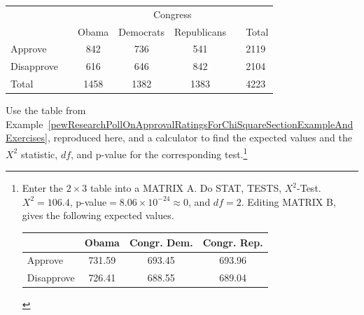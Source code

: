 \begin{tabular}{ll ccc ll}
& & & \multicolumn{2}{c}{Congress} & \\
\cline{4-5}
 & \hspace{1mm} & Obama & Democrats & Republicans & \hspace{1mm} & Total \\
\hline
Approve				   & & 842    & 736 & 541   & 				& 2119 \\
Disapprove			   & & 616    & 646 & 842   &				& 2104 \\
\hline
Total					   & & 1458    & 1382 & 1383 & 				& 4223 \\
\hline
\end{tabular}
 

\begin{exercise}
Use the table from Example~\ref{pewResearchPollOnApprovalRatingsForChiSquareSectionExampleAndExercises}, reproduced here, and a calculator to find the expected values and the $X^2$ statistic, $df$, and p-value for the corresponding test.\footnote{Enter the $2\times 3$ table into a MATRIX A. Do STAT, TESTS, $X^2$-Test. $X^2=106.4$, p-value$=8.06\times 10^{-24}\approx 0$, and $df=2$. Editing MATRIX B, gives the following expected values.
\begin{tabular}{l ccc}
&Obama  &Congr. Dem. & Congr. Rep. \\
\hline
Approve				    & 731.59    & 693.45 & 693.96   \\
Disapprove			    & 726.41    & 688.55 & 689.04  \\
\hline
\end{tabular}
}
\end{exercise}
